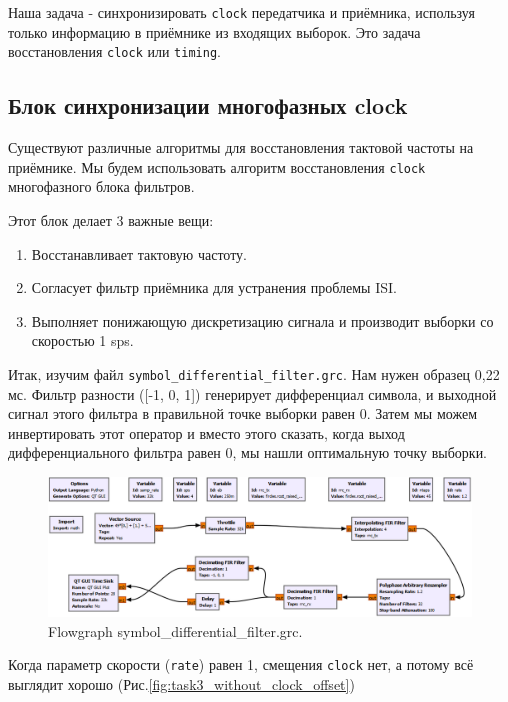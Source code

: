 \documentclass[a4paper, 14pt]{extarticle}
\begin{document}
    Наша задача - синхронизировать \texttt{clock} передатчика и приёмника, используя только информацию в приёмнике из
    входящих выборок. Это задача восстановления \texttt{clock} или \texttt{timing}.

    \newpage
    \subsection{Блок синхронизации многофазных clock}
    \label{subsec:task3_clock_polyphase}

    Существуют различные алгоритмы для восстановления тактовой частоты на приёмнике.
    Мы будем использовать алгоритм восстановления \texttt{clock} многофазного блока фильтров.

    Этот блок делает 3 важные вещи:
    \begin{enumerate}
        \item Восстанавливает тактовую частоту.
        \item Согласует фильтр приёмника для устранения проблемы ISI.
        \item Выполняет понижающую дискретизацию сигнала и производит выборки со скоростью 1 sps.
    \end{enumerate}

    Итак, изучим файл \texttt{symbol\_differential\_filter.grc}.
    Нам нужен образец 0,22 мс.
    Фильтр разности ([-1, 0, 1]) генерирует дифференциал символа, и выходной сигнал этого фильтра в
    правильной точке выборки равен 0.
    Затем мы можем инвертировать этот оператор и вместо этого сказать, когда выход дифференциального
    фильтра равен 0, мы нашли оптимальную точку выборки.

    \begin{figure}[h]
        \centering
        \includegraphics[width=0.9\linewidth]{resources/Images/task3_symbol_differential_filter}
        \caption{Flowgraph symbol\_differential\_filter.grc.}
        \label{fig:task3_symbol_differential_filter}
    \end{figure}

    Когда параметр скорости (\texttt{rate}) равен 1, смещения \texttt{clock} нет, а потому всё выглядит хорошо
    (Рис.\ref{fig:task3_without_clock_offset})
\end{document}
